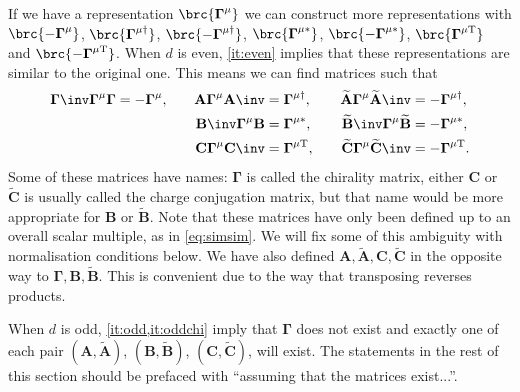 \documentclass[11pt]{article}
\newcommand{\Gammab}{\boldsymbol{\Gamma}}
\newcommand{\mud}{{\mu\dag}}
\newcommand{\mut}{{\mu\mathrm{T}}}
\newcommand{\muc}{{\mu\ast}}
\newcommand{\A}{\mathbf{A}}
\newcommand{\B}{\mathbf{B}}
\renewcommand{\C}{\mathbf{C}}
\newcommand{\At}{\widetilde{\mathbf{A}}}
\newcommand{\Bt}{\widetilde{\mathbf{B}}}
\newcommand{\Ct}{\widetilde{\mathbf{C}}}
\begin{document}
If we have a representation $\brc{\Gammab^\mu}$ we can construct more representations with $\brc{-\Gammab^\mu}$, $\brc{\Gammab^\mud}$, $\brc{-\Gammab^\mud}$, $\brc{\Gammab^\muc}$, $\brc{-\Gammab^\muc}$, $\brc{\Gammab^\mut}$ and $\brc{-\Gammab^\mut}$.
When $d$ is even, \cref{it:even} implies that these representations are similar to the original one.
This means we can find matrices such that
%
\begin{equation}\label{eq:cccmats}
\begin{aligned}
  \Gammab\inv \Gammab^\mu \Gammab &= -\Gammab^\mu, &\quad
  \A  \Gammab^\mu \A\inv  &=  \Gammab^\mud, &\quad
  \At \Gammab^\mu \At\inv &= -\Gammab^\mud, \\ &&
  \B\inv  \Gammab^\mu \B  &=  \Gammab^\muc, &
  \Bt\inv \Gammab^\mu \Bt &= -\Gammab^\muc, \\ &&
  \C  \Gammab^\mu \C\inv  &=  \Gammab^\mut, &
  \Ct \Gammab^\mu \Ct\inv &= -\Gammab^\mut.
\end{aligned}
\end{equation}
%
Some of these matrices have names: $\Gammab$ is called the chirality matrix, either $\C$ or $\Ct$ is usually called the charge conjugation matrix, but that name would be more appropriate for $\B$ or $\Bt$.
Note that these matrices have only been defined up to an overall scalar multiple, as in \cref{eq:simsim}.
We will fix some of this ambiguity with normalisation conditions below.
We have also defined $\A,\At,\C,\Ct$ in the opposite way to $\Gammab,\B,\Bt$.
This is convenient due to the way that transposing reverses products.

When $d$ is odd, \cref{it:odd,it:oddchi} imply that $\Gammab$ does not exist and exactly one of each pair $(\A, \At)$, $(\B, \Bt)$, $(\C, \Ct)$, will exist.
The statements in the rest of this section should be prefaced with ``assuming that the matrices exist...''.
\end{document}
